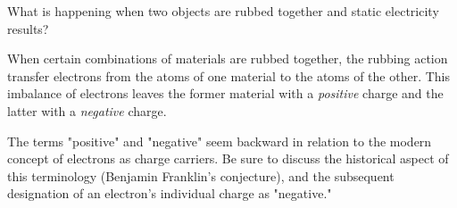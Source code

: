 

What is happening when two objects are rubbed together and static electricity results?







When certain combinations of materials are rubbed together, the rubbing action transfer electrons from the atoms of one material to the atoms of the other.  This imbalance of electrons leaves the former material with a {\it positive} charge and the latter with a {\it negative} charge.







The terms "positive" and "negative" seem backward in relation to the modern concept of electrons as charge carriers.  Be sure to discuss the historical aspect of this terminology (Benjamin Franklin's conjecture), and the subsequent designation of an electron's individual charge as "negative."




